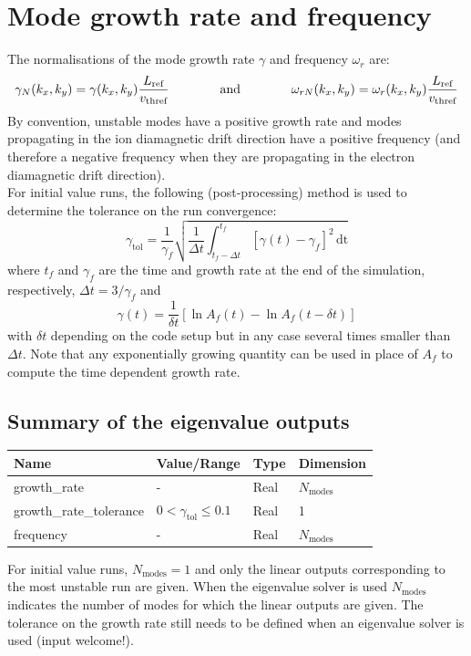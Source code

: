 \documentclass[fleqn]{report}
\begin{document}
\section{Mode growth rate and frequency}
The normalisations of the mode growth rate $\gamma$ and frequency $\omega_r$ are:
\begin{equation}
 \gamma_N(k_x,k_y) = \gamma(k_x,k_y) \frac{L_{\textrm{ref}}}{v_\textrm{thref}} \qquad \qquad \textrm{and} \qquad \qquad \omega_{rN}(k_x,k_y) = \omega_r(k_x,k_y) \frac{L_{\textrm{ref}}}{v_\textrm{thref}}
\end{equation}
By convention, unstable modes have a positive growth rate and modes propagating in the ion diamagnetic drift direction have a positive frequency (and therefore a negative frequency when they are propagating in the electron diamagnetic drift direction).\\

For initial value runs, the following (post-processing) method is used to determine the tolerance on the run convergence:
$$\gamma_\textrm{tol} = \frac{1}{\gamma_f}\sqrt{\frac{1}{\Delta t}\int_{t_f-\Delta t}^{t_f} \left[\gamma(t)-\gamma_f\right]^2\,\textrm{dt}}$$
where $t_f$ and $\gamma_f$ are the time and growth rate at the end of the simulation, respectively, $\Delta t = 3/\gamma_f$ and
$$\gamma(t)=\frac{1}{\delta t}[\ln{A_f(t)}-\ln{A_f(t-\delta t)}]$$
with $\delta t$ depending on the code setup but in any case several times smaller than $\Delta t$. Note that any exponentially growing quantity can be used in place of $A_f$ to compute the time dependent growth rate.

\subsection{Summary of the eigenvalue outputs}
\begin{tabularx}{\textwidth}{|X|Y|Y|Y|}
\hline
Name & Value/Range & Type & Dimension \\
\hline
growth\_rate & - & Real & $N_\textrm{modes}$ \\
growth\_rate\_tolerance & $0<\gamma_\textrm{tol}\leq 0.1$ & Real & 1 \\
frequency & - & Real & $N_\textrm{modes}$ \\
\hline
\end{tabularx}
For initial value runs, $N_\textrm{modes}=1$ and only the linear outputs corresponding to the most unstable run are given. When the eigenvalue solver is used $N_\textrm{modes}$ indicates the number of modes for which the linear outputs are given. The tolerance on the growth rate still needs to be defined when an eigenvalue solver is used (input welcome!).
\end{document}
